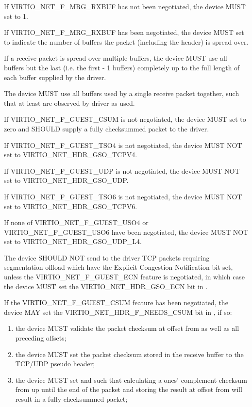 If VIRTIO_NET_F_MRG_RXBUF has not been negotiated, the device MUST set
 to 1.

If VIRTIO_NET_F_MRG_RXBUF has been negotiated, the device MUST set
 to indicate the number of buffers
the packet (including the header) is spread over.

If a receive packet is spread over multiple buffers, the device
MUST use all buffers but the last (i.e. the first  -
1 buffers) completely up to the full length of each buffer
supplied by the driver.

The device MUST use all buffers used by a single receive
packet together, such that at least  are
observed by driver as used.

If VIRTIO_NET_F_GUEST_CSUM is not negotiated, the device MUST set
 to zero and SHOULD supply a fully checksummed
packet to the driver.

If VIRTIO_NET_F_GUEST_TSO4 is not negotiated, the device MUST NOT set
 to VIRTIO_NET_HDR_GSO_TCPV4.

If VIRTIO_NET_F_GUEST_UDP is not negotiated, the device MUST NOT set
 to VIRTIO_NET_HDR_GSO_UDP.

If VIRTIO_NET_F_GUEST_TSO6 is not negotiated, the device MUST NOT set
 to VIRTIO_NET_HDR_GSO_TCPV6.

If none of VIRTIO_NET_F_GUEST_USO4 or VIRTIO_NET_F_GUEST_USO6 have been negotiated,
the device MUST NOT set  to VIRTIO_NET_HDR_GSO_UDP_L4.

The device SHOULD NOT send to the driver TCP packets requiring segmentation offload
which have the Explicit Congestion Notification bit set, unless the
VIRTIO_NET_F_GUEST_ECN feature is negotiated, in which case the
device MUST set the VIRTIO_NET_HDR_GSO_ECN bit in
.

If the VIRTIO_NET_F_GUEST_CSUM feature has been negotiated, the
device MAY set the VIRTIO_NET_HDR_F_NEEDS_CSUM bit in
, if so:
\begin{enumerate}
\item the device MUST validate the packet checksum at
	offset  from  as well as all
	preceding offsets;
\item the device MUST set the packet checksum stored in the
	receive buffer to the TCP/UDP pseudo header;
\item the device MUST set  and
	 such that calculating a ones'
	complement checksum from  up until the
	end of the packet and storing the result at offset
	 from   will result in a
	fully checksummed packet;
\end{enumerate}

